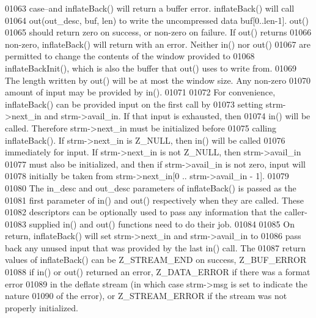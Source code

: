 \begin{DoxyCode}
01063 \textcolor{comment}{   case--and inflateBack() will return a buffer error.  inflateBack() will call}
01064 \textcolor{comment}{   out(out\_desc, buf, len) to write the uncompressed data buf[0..len-1].  out()}
01065 \textcolor{comment}{   should return zero on success, or non-zero on failure.  If out() returns}
01066 \textcolor{comment}{   non-zero, inflateBack() will return with an error.  Neither in() nor out()}
01067 \textcolor{comment}{   are permitted to change the contents of the window provided to}
01068 \textcolor{comment}{   inflateBackInit(), which is also the buffer that out() uses to write from.}
01069 \textcolor{comment}{   The length written by out() will be at most the window size.  Any non-zero}
01070 \textcolor{comment}{   amount of input may be provided by in().}
01071 \textcolor{comment}{}
01072 \textcolor{comment}{     For convenience, inflateBack() can be provided input on the first call by}
01073 \textcolor{comment}{   setting strm->next\_in and strm->avail\_in.  If that input is exhausted, then}
01074 \textcolor{comment}{   in() will be called.  Therefore strm->next\_in must be initialized before}
01075 \textcolor{comment}{   calling inflateBack().  If strm->next\_in is Z\_NULL, then in() will be called}
01076 \textcolor{comment}{   immediately for input.  If strm->next\_in is not Z\_NULL, then strm->avail\_in}
01077 \textcolor{comment}{   must also be initialized, and then if strm->avail\_in is not zero, input will}
01078 \textcolor{comment}{   initially be taken from strm->next\_in[0 ..  strm->avail\_in - 1].}
01079 \textcolor{comment}{}
01080 \textcolor{comment}{     The in\_desc and out\_desc parameters of inflateBack() is passed as the}
01081 \textcolor{comment}{   first parameter of in() and out() respectively when they are called.  These}
01082 \textcolor{comment}{   descriptors can be optionally used to pass any information that the caller-}
01083 \textcolor{comment}{   supplied in() and out() functions need to do their job.}
01084 \textcolor{comment}{}
01085 \textcolor{comment}{     On return, inflateBack() will set strm->next\_in and strm->avail\_in to}
01086 \textcolor{comment}{   pass back any unused input that was provided by the last in() call.  The}
01087 \textcolor{comment}{   return values of inflateBack() can be Z\_STREAM\_END on success, Z\_BUF\_ERROR}
01088 \textcolor{comment}{   if in() or out() returned an error, Z\_DATA\_ERROR if there was a format error}
01089 \textcolor{comment}{   in the deflate stream (in which case strm->msg is set to indicate the nature}
01090 \textcolor{comment}{   of the error), or Z\_STREAM\_ERROR if the stream was not properly initialized.}

\end{DoxyCode}
